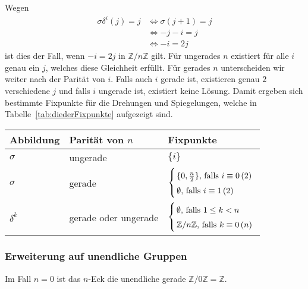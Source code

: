 \documentclass[12pt, german]{article}
\newcommand{\Z}{\mathbb{Z}}
\begin{document}
	Wegen
	\begin{align*}
		\sigma\delta^i(j)  = j &\iff \sigma(j+1)  = j  \\
		&\iff 	-j -i  = j \\
		&\iff 	-i  = 2j
	\end{align*} 
	ist dies der Fall, wenn $-i = 2j \textrm{ in } \mathbb Z /n \mathbb Z$ gilt. Für ungerades $n$ existiert für alle $i$ genau ein $j$, welches diese Gleichheit erfüllt. Für gerades $n$ unterscheiden wir weiter nach der Parität von $i$. Falls auch $i$ gerade ist, existieren genau $2$ verschiedene $j$ und falls $i$ ungerade ist, existiert keine Lösung. Damit ergeben sich bestimmte Fixpunkte für die Drehungen und Spiegelungen, welche in Tabelle~\ref{tab:diederFixpunkte} aufgezeigt sind.
	\begin{table*}[h]
		\centering
		\begin{tabular}{lll}
			\toprule[2pt]
			Abbildung & Parität von $n$ & Fixpunkte\\
			\midrule
			$\sigma$ & ungerade & $\{i\}$ \\
			\addlinespace
			$\sigma$ & gerade & $ \left \{
			
			\arraycolsep=1.4pt\def\arraystretch{1.5}
			\begin{array}{ll}
				\{0,\frac{n}{2}\}\textrm{, falls }i \equiv 0 \, (2)\\
				\emptyset\textrm{, falls } i \equiv 1\, (2)
			\end{array}
			\right. $ \\
			\addlinespace
			$\delta^k$ & gerade oder ungerade & $ \left \{
			\arraycolsep=1.4pt\def\arraystretch{1.5}
			\begin{array}{ll}
				\emptyset\textrm{, falls }1\leq k < n\\
				\Z/n\Z\textrm{, falls } k \equiv 0\, (n)
			\end{array}
			\right. $ \\
			\bottomrule[2pt]
		\end{tabular}
		\caption{Fixpunkte der Abbildungen in Diedergruppen.}
		\label{tab:diederFixpunkte}
	\end{table*}
	
	\subsubsection{Erweiterung auf unendliche Gruppen}
	
	Im Fall $n=0$ ist das $n$-Eck die unendliche gerade $\Z/0\Z = \Z$.
	
\end{document}
